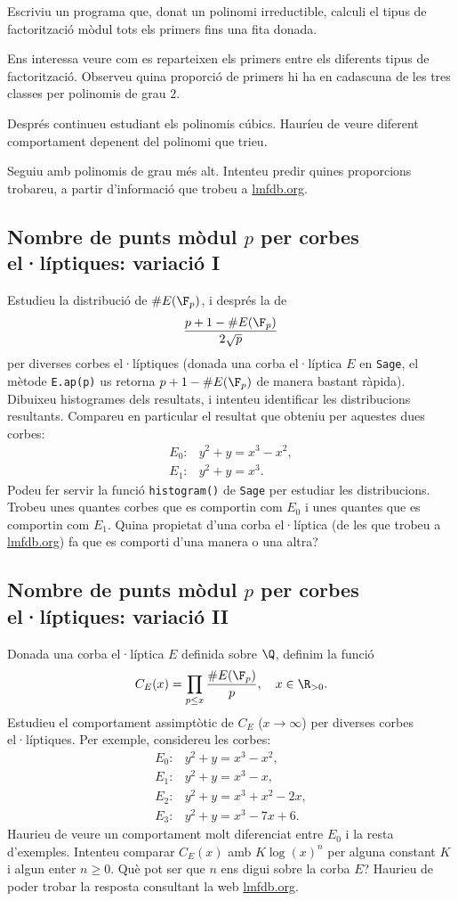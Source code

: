  Escriviu un programa que, donat un polinomi irreductible, calculi el tipus de factorització mòdul tots els primers fins una fita donada.
 
 Ens interessa veure com es reparteixen els primers entre els diferents tipus de factorització. Observeu quina proporció de primers hi ha en cadascuna de les tres classes per polinomis de grau $2$.
 
 Després continueu estudiant els polinomis cúbics. Hauríeu de veure diferent comportament depenent del polinomi que trieu.
 
 Seguiu amb polinomis de grau més alt. Intenteu predir quines proporcions trobareu, a partir d'informació que trobeu a \url{lmfdb.org}.
 

 \subsection{Nombre de punts mòdul \texorpdfstring{$p$}{p} per corbes el·líptiques: variació I}
 Estudieu la distribució de $\#E(\F_p)$, i després la de
 \[
 \frac{p+1 - \#E(\F_p)}{2\sqrt{p}}
 \]
 per diverses corbes el·líptiques (donada una corba el·líptica $E$ en \texttt{Sage}, el mètode \texttt{E.ap(p)} us retorna $p+1-\#E(\F_p)$ de manera bastant ràpida). Dibuixeu histogrames dels resultats, i intenteu identificar les distribucions resultants. Compareu en particular el resultat que obteniu per aquestes dues corbes:
 \begin{align*}
     E_0\colon & y^2 + y = x^3 - x^2,\\
     E_1\colon & y^2 + y = x^3.
 \end{align*}
 Podeu fer servir la funció \texttt{histogram()} de \texttt{Sage} per estudiar les distribucions. Trobeu unes quantes corbes que es comportin com $E_0$ i unes quantes que es comportin com $E_1$. Quina propietat d'una corba el·líptica (de les que trobeu a \url{lmfdb.org}) fa que es comporti d'una manera o una altra?
 
 \subsection{Nombre de punts mòdul \texorpdfstring{$p$}{p} per corbes el·líptiques: variació II}
 Donada una corba el·líptica $E$ definida sobre $\Q$, definim la funció
 \[
 C_E(x) = \prod_{p\leq x}\frac{\#E(\F_p)}{p},\quad x\in\R_{>0}.
 \]
 Estudieu el comportament assimptòtic de $C_E$ ($x\to\infty$) per diverses corbes el·líptiques. Per exemple, considereu les corbes:
 \begin{align*}
E_0\colon& y^2+y=x^3-x^2,\\
E_1\colon& y^2+y=x^3-x,\\
E_2\colon& y^2+y = x^3+x^2-2x,\\
E_3\colon&y^2 +y =x^3 - 7x+6.
\end{align*}
Haurieu de veure un comportament molt diferenciat entre $E_0$ i la resta d'exemples. Intenteu comparar $C_E(x)$ amb $K\log(x)^n$ per alguna constant $K$ i algun enter $n\geq 0$. Què pot ser que $n$ ens digui sobre la corba $E$? Haurieu de poder trobar la resposta consultant la web \url{lmfdb.org}.

